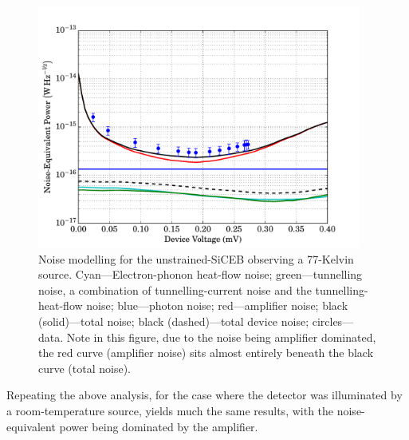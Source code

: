 \begin{figure}[tb]
\begin{center}
\includegraphics[width = 0.95\textwidth]{figures/control_noiseModel77}
\caption[Noise modelling for the unstrained-SiCEB observing a 77-Kelvin source]{Noise modelling for the unstrained-SiCEB observing a 77-Kelvin source. Cyan---Electron-phonon heat-flow noise; green---tunnelling noise, a combination of tunnelling-current noise and the tunnelling-heat-flow noise; blue---photon noise; red---amplifier noise; black (solid)---total noise; black (dashed)---total device noise; circles---data. Note in this figure, due to the noise being amplifier dominated, the red curve (amplifier noise) sits almost entirely beneath the black curve (total noise).}
\label{fig:controlNoiseModel77}
\end{center}
\end{figure}
\par 
Repeating the above analysis, for the case where the detector was illuminated by a room-temperature source, yields much the same results, with the noise-equivalent power being dominated by the amplifier.
%
